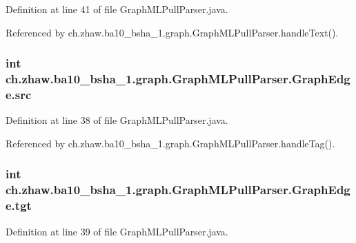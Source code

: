 Definition at line 41 of file GraphMLPullParser.java.

Referenced by ch.zhaw.ba10\_\-bsha\_\-1.graph.GraphMLPullParser.handleText().\hypertarget{classch_1_1zhaw_1_1ba10__bsha__1_1_1graph_1_1GraphMLPullParser_1_1GraphEdge_a8ddd9c31ff9cbe6303c70fa75c7c7a0f}{
\subsubsection[{src}]{\setlength{\rightskip}{0pt plus 5cm}int {\bf ch.zhaw.ba10\_\-bsha\_\-1.graph.GraphMLPullParser.GraphEdge.src}}}
\label{classch_1_1zhaw_1_1ba10__bsha__1_1_1graph_1_1GraphMLPullParser_1_1GraphEdge_a8ddd9c31ff9cbe6303c70fa75c7c7a0f}


Definition at line 38 of file GraphMLPullParser.java.

Referenced by ch.zhaw.ba10\_\-bsha\_\-1.graph.GraphMLPullParser.handleTag().\hypertarget{classch_1_1zhaw_1_1ba10__bsha__1_1_1graph_1_1GraphMLPullParser_1_1GraphEdge_ab4607327cafc0923bb9b5d0ca34abe1e}{
\subsubsection[{tgt}]{\setlength{\rightskip}{0pt plus 5cm}int {\bf ch.zhaw.ba10\_\-bsha\_\-1.graph.GraphMLPullParser.GraphEdge.tgt}}}
\label{classch_1_1zhaw_1_1ba10__bsha__1_1_1graph_1_1GraphMLPullParser_1_1GraphEdge_ab4607327cafc0923bb9b5d0ca34abe1e}


Definition at line 39 of file GraphMLPullParser.java.

